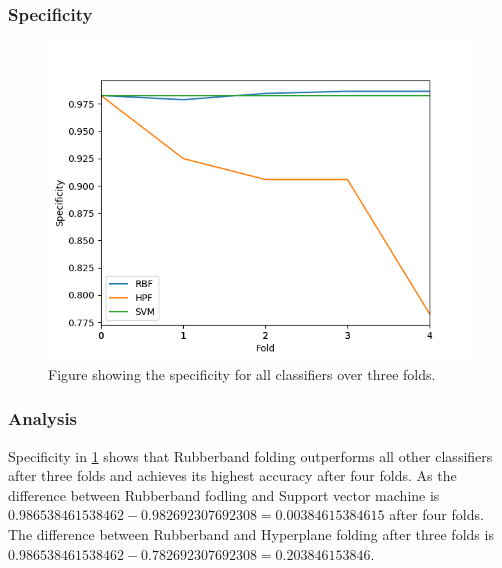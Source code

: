 \documentclass[a4paper,twoside]{bth}
\begin{document}
\subsubsection{Specificity}
\begin{figure}[!htb]
\centering
\includegraphics[scale=0.7]{images/result-bmi/Specificity.png}
   \caption{Figure showing the specificity for all classifiers over three folds.}
   \label{fig:bmi-Specificty}
\end{figure}

\FloatBarrier

\subsubsection{Analysis}
Specificity  in \ref{fig:bmi-Specificty} shows that Rubberband folding outperforms all other classifiers after three folds and achieves its highest accuracy after four folds. As the difference between Rubberband fodling and Support vector machine is $0.986538461538462 - 0.982692307692308 = 0.00384615384615$ after four folds. The difference between Rubberband and Hyperplane folding after three folds is $0.986538461538462 - 0.782692307692308 = 0.203846153846$.

\clearpage
\FloatBarrier
\end{document}
